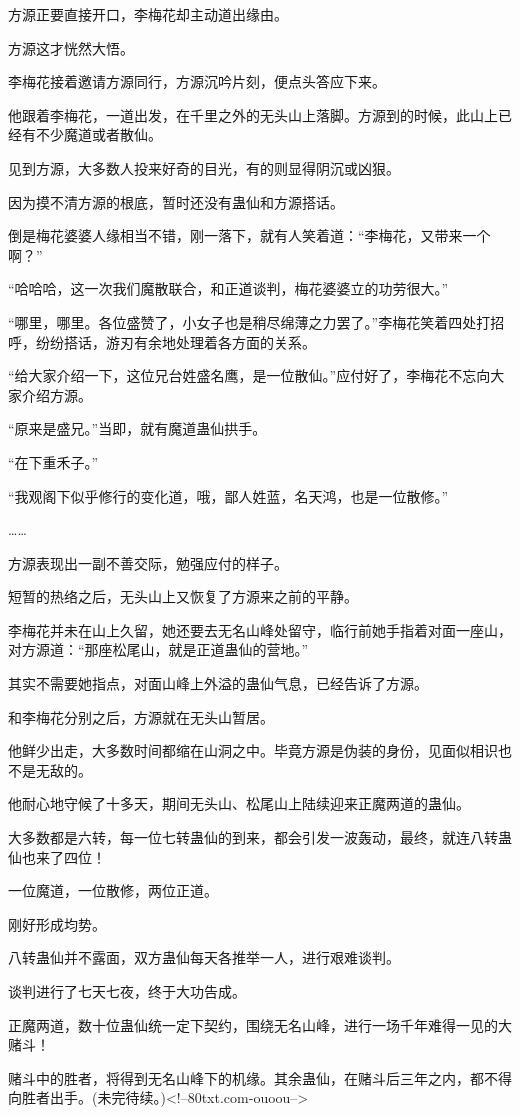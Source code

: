 \begin{this_body}
方源正要直接开口，李梅花却主动道出缘由。

方源这才恍然大悟。

李梅花接着邀请方源同行，方源沉吟片刻，便点头答应下来。

他跟着李梅花，一道出发，在千里之外的无头山上落脚。方源到的时候，此山上已经有不少魔道或者散仙。

见到方源，大多数人投来好奇的目光，有的则显得阴沉或凶狠。

因为摸不清方源的根底，暂时还没有蛊仙和方源搭话。

倒是梅花婆婆人缘相当不错，刚一落下，就有人笑着道：“李梅花，又带来一个啊？”

“哈哈哈，这一次我们魔散联合，和正道谈判，梅花婆婆立的功劳很大。”

“哪里，哪里。各位盛赞了，小女子也是稍尽绵薄之力罢了。”李梅花笑着四处打招呼，纷纷搭话，游刃有余地处理着各方面的关系。

“给大家介绍一下，这位兄台姓盛名鹰，是一位散仙。”应付好了，李梅花不忘向大家介绍方源。

“原来是盛兄。”当即，就有魔道蛊仙拱手。

“在下重禾子。”

“我观阁下似乎修行的变化道，哦，鄙人姓蓝，名天鸿，也是一位散修。”

……

方源表现出一副不善交际，勉强应付的样子。

短暂的热络之后，无头山上又恢复了方源来之前的平静。

李梅花并未在山上久留，她还要去无名山峰处留守，临行前她手指着对面一座山，对方源道：“那座松尾山，就是正道蛊仙的营地。”

其实不需要她指点，对面山峰上外溢的蛊仙气息，已经告诉了方源。

和李梅花分别之后，方源就在无头山暂居。

他鲜少出走，大多数时间都缩在山洞之中。毕竟方源是伪装的身份，见面似相识也不是无敌的。

他耐心地守候了十多天，期间无头山、松尾山上陆续迎来正魔两道的蛊仙。

大多数都是六转，每一位七转蛊仙的到来，都会引发一波轰动，最终，就连八转蛊仙也来了四位！

一位魔道，一位散修，两位正道。

刚好形成均势。

八转蛊仙并不露面，双方蛊仙每天各推举一人，进行艰难谈判。

谈判进行了七天七夜，终于大功告成。

正魔两道，数十位蛊仙统一定下契约，围绕无名山峰，进行一场千年难得一见的大赌斗！

赌斗中的胜者，将得到无名山峰下的机缘。其余蛊仙，在赌斗后三年之内，都不得向胜者出手。(未完待续。)<!--80txt.com-ouoou-->

\end{this_body}

